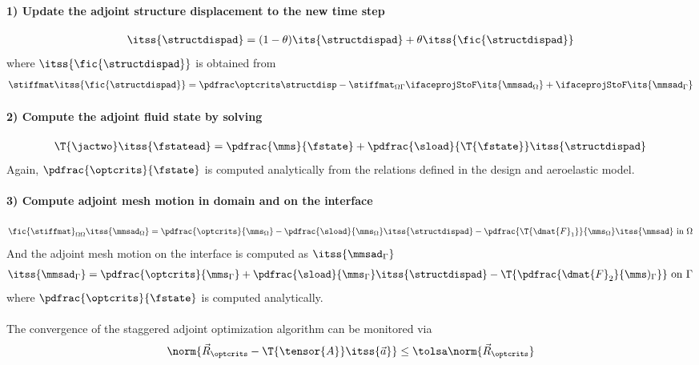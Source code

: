 \documentclass[../main.tex]{subfiles}
\begin{document}
\paragraph{1) Update the adjoint structure displacement to the new time step}
\begin{align}
\itss{\structdispad}=(1-\theta)\its{\structdispad}+\theta \itss{\fic{\structdispad}}
\end{align}
where $\itss{\fic{\structdispad}}$ is obtained from
\begin{align}
\stiffmat \itss{\fic{\structdispad}} = \PoptcritsBYstructdisp - \stiffmat_{\Omega\Gamma} \ifaceprojStoF \its{{\mmsad}_{\Omega}} + \ifaceprojStoF \its{{\mmsad}_{\Gamma}}
\end{align}

\paragraph{2) Compute the adjoint fluid state by solving}
\begin{align}
\T{\jactwo} \itss{\fstatead} = \pdfrac{\mms}{\fstate}+ \pdfrac{\sload}{\T{\fstate}} \itss{\structdispad}
\end{align}
Again, $\pdfrac{\optcrits}{\fstate}$ is computed analytically from the relations defined in the design and aeroelastic model.


\paragraph{3) Compute adjoint mesh motion in domain and on the interface}
\def\PoptcritsBYfstate{\pdfrac{\optcrits}{\fstate}}
\begin{align}
\fic{\stiffmat}_{\Omega\Omega} \itss{{\mmsad}_{\Omega}} =
\pdfrac{\optcrits}{\mms_\Omega} -
\pdfrac{\sload}{\mms_\Omega} \itss{\structdispad} -
\pdfrac{\T{\dmat{F}_1}}{\mms_\Omega} \itss{\mmsad}\text{ in }\Omega
\end{align}
And the adjoint mesh motion on the interface is computed as $\itss{{\mmsad}_{\Gamma}}$
\begin{align}
\itss{{\mmsad}_{\Gamma}} =
\pdfrac{\optcrits}{\mms_{\Gamma}} +
\pdfrac{\sload}{\mms_\Gamma} \itss{\structdispad}    -
\T{\pdfrac{\dmat{F}_2}{\mms)_\Gamma}}\text{ on }\Gamma
\end{align}
where $\PoptcritsBYfstate$ is computed analytically.
~\\
~\\
The convergence of the staggered adjoint optimization algorithm can be monitored via
\begin{align}
\norm{\vec{R}_{\optcrits}-
\T{\tensor{A}} \itss{\vec{a}} }
\leq
\tolsa\norm{\vec{R}_{\optcrits}}
\end{align}
\end{document}

